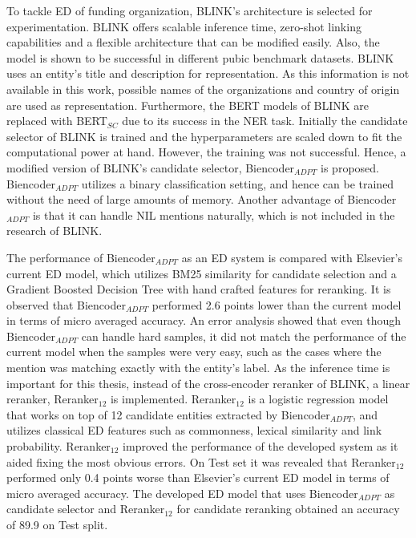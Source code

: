 \documentclass{report}
\theoremstyle{definition}
\theoremstyle{remark}
\begin{document}
To tackle ED of funding organization, BLINK's architecture is selected for experimentation. BLINK offers scalable inference time, zero-shot linking capabilities and a flexible architecture that can be modified easily. Also, the model is shown to be successful in different pubic benchmark datasets. BLINK uses an entity's title and description for representation. As this information is not available in this work, possible names of the organizations and country of origin are used as representation. Furthermore, the BERT models of BLINK are replaced with BERT$_{SC}$ due to its success in the NER task. Initially the candidate selector of BLINK is trained and the hyperparameters are scaled down to fit the computational power at hand. However, the training was not successful. Hence, a modified version of BLINK's candidate selector, Biencoder$_{ADPT}$ is proposed. Biencoder$_{ADPT}$ utilizes a binary classification setting, and hence can be trained without the need of large amounts of memory. Another advantage of Biencoder$_{ADPT}$ is that it can handle NIL mentions naturally, which is not included in the research of BLINK.

The performance of Biencoder$_{ADPT}$ as an ED system is compared with Elsevier's current ED model, which utilizes BM25 similarity for candidate selection and a Gradient Boosted Decision Tree with hand crafted features for reranking. It is observed that Biencoder$_{ADPT}$ performed 2.6 points lower than the current model in terms of micro averaged accuracy. An error analysis showed that even though Biencoder$_{ADPT}$ can handle hard samples, it did not match the performance of the current model when the samples were very easy, such as the cases where the mention was matching exactly with the entity's label. As the inference time is important for this thesis, instead of the cross-encoder reranker of BLINK, a linear reranker, Reranker$_{12}$ is implemented. Reranker$_{12}$ is a logistic regression model that works on top of 12 candidate entities extracted by Biencoder$_{ADPT}$, and utilizes classical ED features such as commonness, lexical similarity and link probability. Reranker$_{12}$ improved the performance of the developed system as it aided fixing the most obvious errors. On Test set it was revealed that Reranker$_{12}$ performed only 0.4 points worse than Elsevier's current ED model in terms of micro averaged accuracy. The developed ED model that uses Biencoder$_{ADPT}$ as candidate selector and Reranker$_{12}$ for candidate reranking obtained an accuracy of 89.9 on Test split.
\end{document}
